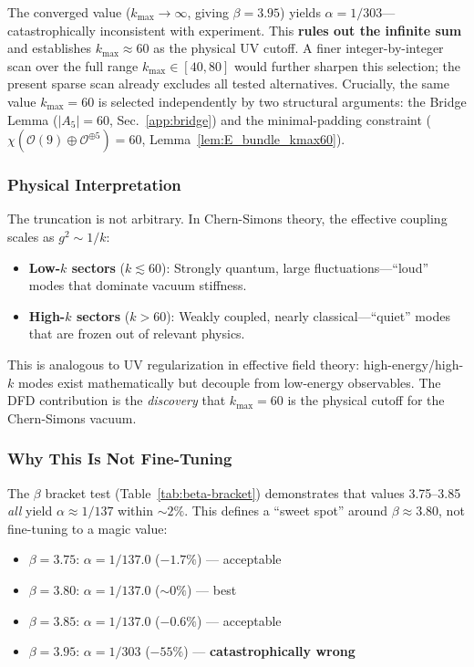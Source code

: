 The converged value ($k_{\max} \to \infty$, giving $\beta = 3.95$) yields $\alpha = 1/303$---catastrophically inconsistent with experiment. This \textbf{rules out the infinite sum} and establishes $k_{\max} \approx 60$ as the physical UV cutoff.  A finer integer-by-integer scan over the full range $k_{\max} \in [40, 80]$ would further sharpen this selection; the present sparse scan already excludes all tested alternatives.  Crucially, the same value $k_{\max} = 60$ is selected independently by two structural arguments: the Bridge Lemma ($|A_5| = 60$, Sec.~\ref{app:bridge}) and the minimal-padding constraint ($\chi(\mathcal{O}(9) \oplus \mathcal{O}^{\oplus 5}) = 60$, Lemma~\ref{lem:E_bundle_kmax60}).

\subsubsection{Physical Interpretation}

The truncation is not arbitrary. In Chern-Simons theory, the effective coupling scales as $g^2 \sim 1/k$:
\begin{itemize}
\item \textbf{Low-$k$ sectors} ($k \lesssim 60$): Strongly quantum, large fluctuations---``loud'' modes that dominate vacuum stiffness.
\item \textbf{High-$k$ sectors} ($k > 60$): Weakly coupled, nearly classical---``quiet'' modes that are frozen out of relevant physics.
\end{itemize}

This is analogous to UV regularization in effective field theory: high-energy/high-$k$ modes exist mathematically but decouple from low-energy observables. The DFD contribution is the \textit{discovery} that $k_{\max} = 60$ is the physical cutoff for the Chern-Simons vacuum.

\subsubsection{Why This Is Not Fine-Tuning}

The $\beta$ bracket test (Table~\ref{tab:beta-bracket}) demonstrates that values 3.75--3.85 \textit{all} yield $\alpha \approx 1/137$ within $\sim 2\%$. This defines a ``sweet spot'' around $\beta \approx 3.80$, not fine-tuning to a magic value:
\begin{itemize}
\item $\beta = 3.75$: $\alpha = 1/137.0$ ($-1.7\%$) --- acceptable
\item $\beta = 3.80$: $\alpha = 1/137.0$ ($\sim 0\%$) --- best
\item $\beta = 3.85$: $\alpha = 1/137.0$ ($-0.6\%$) --- acceptable
\item $\beta = 3.95$: $\alpha = 1/303$ ($-55\%$) --- \textbf{catastrophically wrong}
\end{itemize}

